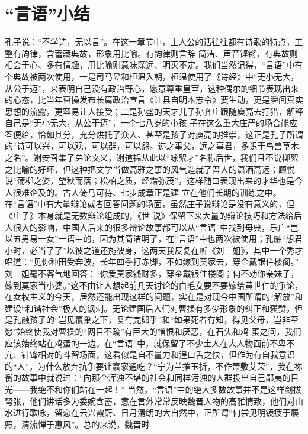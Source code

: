 \documentclass[]{book}
\begin{document}
\section{\texorpdfstring{``言语''小结}{言语小结}}

孔子说：``不学诗，无以言''。在这一章节中，主人公的话往往都有诗歌的特点，工整有韵律，含蓄藏典故，形象用比喻。有韵律则言辞
简洁、声音铿锵，有典故则相会于心、多有情趣，用比喻则意味深远、明灭不定。我们当然记得，``言语''中有个典故被两次使用，一是司马昱和桓温入朝，桓温使用了《诗经》中``无小无大，从公于迈''，来表明自己没有政治野心，愿意尊重皇室，这种偶尔的细节表现出来的心态，比当年曹操发布长篇政治宣言《让县自明本志令》要生动，更是瞬间真实思想的流露，更容易让人接受；二是孙盛的天才儿子孙齐庄跟随庾亮去打猎，解释自己是``无小无大，从公于迈''，一个七八岁的小孩
子在这么重大庄严的场合能应答便给，恰如其分，充分烘托了众人、甚至是孩子对庾亮的推崇，这正是孔子所谓的``诗可以兴，可以观，可以群，可以怨。迩之事父，远之事君，多识于鸟兽草木之名''。谢安召集子弟论文义，谢道韫从此以``咏絮才''名称后世，我们且不说柳絮之比喻的好坏，但这种把文学当做高雅之事的风气造就了晋人的潇洒高远；顾悦说``蒲柳之姿，望秋而落；松柏之质，经霜弥茂''，这样随口表现出来的才华也是今人很难企及的。古人倚马可待、七步成章正是建
立在他们长期的训练之中。
在``言语''中有大量辩论或者回答问题的场面，虽然庄子说辩论是没有意义的，但《庄子》本身就是无数辩论组成的，《世
说》保留下来大量的辩论技巧和方法给后人很大的影响，中国人后来的很多辩论故事都可以从``言语''中找到母典，乐广``岂以五男易一女''一语中的，因为其简洁明了，在``言语''中也两次被使用；孔融``想君小时，必当了了''以彼之道还施彼身，这两天我反复在听《刘三姐》，其中一个秀才唱道：``见你种田受奔波，长年四季打赤脚，不如嫁到莫家去，穿金戴银住楼阁。''
刘三姐毫不客气地回答：``你爱莫家钱财多，穿金戴银住楼阁；何不劝你亲妹子，嫁到莫家当小婆。''这不由让人想起前几天讨论的白毛女要不要嫁给黄世仁的争论，在女权主义的今天，居然还能出现这样的问题，实在是对现今中国所谓的``解放''和建设``和谐社会''极大的讽刺。无论建国后人们对曹操有多少形象的纠正和褒赞，但是孔融孩子的``岂见覆巢之下，复有完卵乎''和``如果死者有知，得见父母，岂非至愿''始终使我对曹操的``网目不疏''有巨大的憎恨和厌恶，在石头和鸡
蛋之间，我们应该始终站在鸡蛋的一边。在``言语''中，就保留了不少士人在大人物面前不卑不亢、针锋相对的斗智场面，这看似是自不量力和逞口舌之快，但作为有自我意识的``人''，为什么放弃抗争要让赢家通吃？``宁为兰摧玉折，不作萧敷艾荣''，我在祢衡的故事中就说过：``向那个浑浊不堪的社会和同样污浊的人群投出自己鄙夷的目光------我绝不和你们站在一起！''
当然，``言语''中的绝大多数故事并不是这样剑拔弩张，他们讲话多为委婉含蓄，意在言外常常反映魏晋人物的高雅情致，他们对山水进行歌咏，留恋在云兴霞蔚、日月清朗的大自然中，正所谓``何尝见明镜疲于屡照，清流惮于惠风''。总的来说，魏晋时
\end{document}
